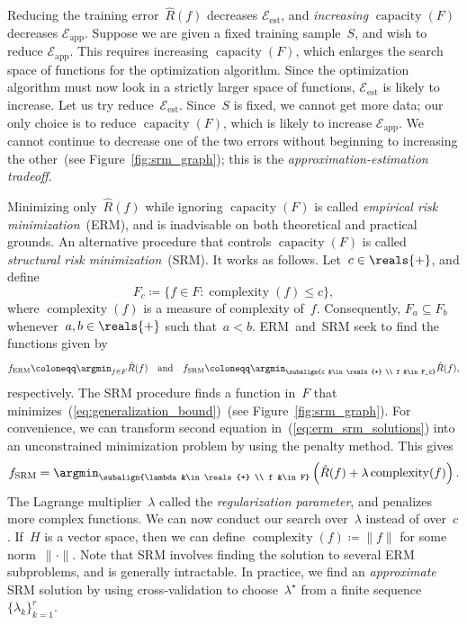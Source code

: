 \documentclass[11pt,a4paper]{article}
\numberwithin{equation}{section}
\newcommand{\capacity}{\operatorname{capacity}}
\newcommand{\complexity}{\operatorname{complexity}}
\newcommand{\apperr}{\mathcal{E}_{\mathrm{app}}}
\newcommand{\esterr}{\mathcal{E}_{\mathrm{est}}}
\begin{document}
Reducing the training error~$\hat{R}(f)$ decreases $\esterr$, and
\emph{increasing} $\capacity(F)$ decreases $\apperr$. Suppose we are given a
fixed training sample~$S$, and wish to reduce $\apperr$. This requires
increasing $\capacity(F)$, which enlarges the search space of functions for the
optimization algorithm. Since the optimization algorithm must now look in a
strictly larger space of functions, $\esterr$ is likely to increase. Let us try
reduce~$\esterr$. Since~$S$ is fixed, we cannot get more data; our only choice
is to reduce $\capacity(F)$, which is likely to increase $\apperr$. We cannot
continue to decrease one of the two errors without beginning to increasing the
other~(see Figure~\ref{fig:srm_graph}); this is the
\emph{approximation-estimation tradeoff}.

Minimizing only~$\hat{R}(f)$ while ignoring $\capacity(F)$ is called
\emph{empirical risk minimization}~(ERM), and is inadvisable on both theoretical
and practical grounds. An alternative procedure that controls $\capacity(F)$ is
called \emph{structural risk minimization}~(SRM). It works as follows. Let~$c
\in \reals{+}$, and define
\begin{equation}
	F_c \coloneqq \{ f \in F : \complexity(f) \leq c \},
	\label{eq:regularized_family}
\end{equation}
where $\complexity(f)$ is a measure of complexity of~$f$. Consequently, $F_a
\subseteq F_b$ whenever~$a, b \in \reals{+}$ such that~$a < b$. ERM~and~SRM seek
to find the functions given by
\begin{equation}
	f_{\text{ERM}} \coloneqq \argmin_{f \in F} \hat{R}(f)
	\quad\text{and}\quad
	f_{\text{SRM}} \coloneqq \argmin_{\subalign{c &\in \reals{+} \\ f &\in F_c}}
		\hat{R}(f),
	\label{eq:erm_srm_solutions}
\end{equation}
respectively. The SRM procedure finds a function in~$F$ that
minimizes~(\ref{eq:generalization_bound})~(see Figure~\ref{fig:srm_graph}). For
convenience, we can transform second equation in~(\ref{eq:erm_srm_solutions})
into an unconstrained minimization problem by using the penalty method. This
gives
\begin{equation}
	f_{\text{SRM}} = \argmin_{\subalign{\lambda &\in \reals{+} \\ f &\in F}}
		\left(\hat{R}(f) + \lambda\complexity(f)\right).
	\label{eq:srm_penalty}
\end{equation}
The Lagrange multiplier~$\lambda$ called the \emph{regularization parameter},
and penalizes more complex functions. We can now conduct our search
over~$\lambda$ instead of over~$c$. If~$H$ is a vector space, then we can define
$\complexity(f) \coloneqq \|f\|$ for some norm~${\|\cdot\|}$. Note that SRM
involves finding the solution to several ERM subproblems, and is generally
intractable. In practice, we find an \emph{approximate} SRM solution by using
cross-validation to choose~$\lambda^\star$ from a finite sequence~$\{ \lambda_k
\}_{k = 1}^r$.
\end{document}
